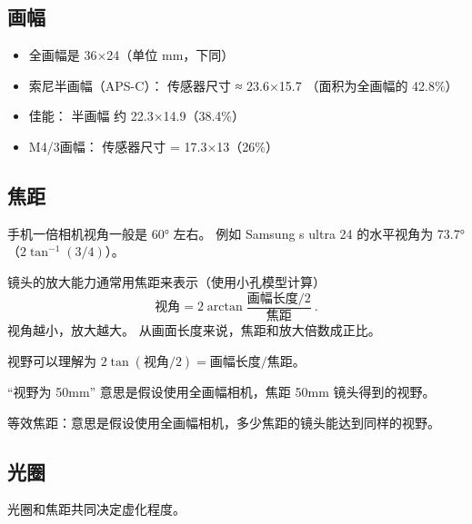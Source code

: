 
\subsection{画幅}
\begin{itemize}
\item 全画幅是 36×24（单位 mm，下同）
\item 索尼半画幅（APS-C）： 传感器尺寸 ≈ 23.6×15.7 （面积为全画幅的 42.8\%）
\item 佳能： 半画幅 约 22.3×14.9（38.4\%）
\item M4/3画幅： 传感器尺寸 = 17.3×13（26\%）
\end{itemize}

\subsection{焦距}
手机一倍相机视角一般是 60° 左右。 例如 Samsung s ultra 24 的水平视角为 73.7°（$2\tan^{-1}(3/4)$）。

镜头的放大能力通常用焦距来表示（使用小孔模型计算）
\begin{equation}
\text{视角} = 2\arctan{\frac{\text{画幅长度/2}}{\text{焦距}}}~.
\end{equation}
视角越小，放大越大。 从画面长度来说，焦距和放大倍数成正比。

视野可以理解为 $2\tan(\text{视角}/2) = \text{画幅长度}/{\text{焦距}}$。

“视野为 50mm” 意思是假设使用全画幅相机，焦距 50mm 镜头得到的视野。

等效焦距：意思是假设使用全画幅相机，多少焦距的镜头能达到同样的视野。

\subsection{光圈}
光圈和焦距共同决定虚化程度。
